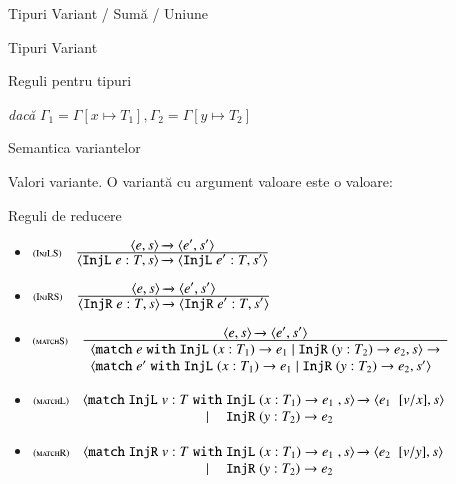 \documentclass[xcolor=pdftex,romanian,colorlinks]{beamer}
\begin{document}
\begin{section}{Tipuri Variant / Sumă / Uniune}
\begin{frame}{Tipuri Variant}
\begin{block}{Reguli pentru tipuri}
{\begin{itemize}
\hfill {\it dacă} $\Gamma_1 = \Gamma[x \mapsto T_1], \Gamma_2 = \Gamma[y \mapsto T_2]$ 

\end{itemize}
}
\end{block}
\end{frame}

\begin{frame}{Semantica variantelor}
\begin{block}{Valori variante. \color{black}
O variantă cu argument valoare este o valoare:}
\end{block}
\begin{block}{Reguli de reducere}
{\small
\begin{itemize}
\item[] $\reg[InjLS]{\Ss{\c{\SInjL e : T,s}}{\c{\SInjL e' : T,s'}}}{\Ss{\c{e,s}}{\c{e',s'}}}{}$
\item[] $\reg[InjRS]{\Ss{\c{\SInjR e : T,s}}{\c{\SInjR e' : T,s'}}}{\Ss{\c{e,s}}{\c{e',s'}}}{}$

\item[] $\reg[matchS]{\begin{array}{l}\c{\Smatch e \Swith {\SInjL (x:T_1) \rightarrow e_1} \mid {\SInjR (y:T_2) \rightarrow e_2},s} \rightarrow \\ \c{\Smatch e' \Swith {\SInjL (x:T_1) \rightarrow e_1} \mid {\SInjR (y:T_2) \rightarrow e_2},s'}\end{array}}{\Ss{\c{e,s}}{\c{e',s'}}}{}$

\item[] $\reg[matchL]{\Ss{\c{\Smatch {\SInjL v : T} \begin{array}[t]{@{\;}c@{\;}l@{\;}}\Swith& {\SInjL (x:T_1) \rightarrow e_1}\\  \mid & {\SInjR (y:T_2) \rightarrow e_2}\end{array},s}}{\c{\substapp{e_1}{\subst{\substpair{v}{x}}},s}}}{}{}$

\item[] $\reg[matchR]{\Ss{\c{\Smatch {\SInjR v : T} \begin{array}[t]{@{\;}c@{\;}l@{\;}}\Swith& {\SInjL (x:T_1) \rightarrow e_1}\\  \mid & {\SInjR (y:T_2) \rightarrow e_2}\end{array},s}}{\c{\substapp{e_2}{\subst{\substpair{v}{y}}},s}}}{}{}$
\end{itemize}
} 
\end{block}
\end{frame}


\end{section}
\end{document}
